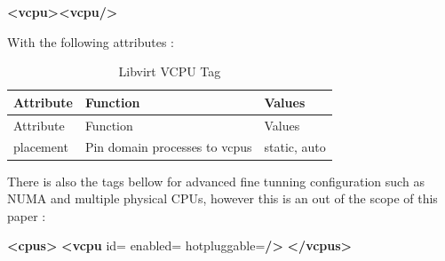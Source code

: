 \documentclass[
  14pt,
  english,
  a4paper,
]{scrreprt}
\newenvironment{Shaded}{}{}
\newcommand{\KeywordTok}[1]{\textcolor[rgb]{0.00,0.44,0.13}{\textbf{#1}}}
\newcommand{\OtherTok}[1]{\textcolor[rgb]{0.00,0.44,0.13}{#1}}
\newcommand{\StringTok}[1]{\textcolor[rgb]{0.25,0.44,0.63}{#1}}
\begin{document}
\begin{Shaded}
\begin{Highlighting}[]
\KeywordTok{\textless{}vcpu\textgreater{}\textless{}vcpu/\textgreater{}}
\end{Highlighting}
\end{Shaded}

With the following attributes :

\hypertarget{tbl:lvirt_vcpu_tag}{}
\begin{longtable}[]{@{}lll@{}}
\caption{\label{tbl:lvirt_vcpu_tag}Libvirt VCPU Tag}\tabularnewline
\toprule
\begin{minipage}[b]{0.15\columnwidth}\raggedright
Attribute\strut
\end{minipage} & \begin{minipage}[b]{0.41\columnwidth}\raggedright
Function\strut
\end{minipage} & \begin{minipage}[b]{0.19\columnwidth}\raggedright
Values\strut
\end{minipage}\tabularnewline
\midrule
\endfirsthead
\toprule
\begin{minipage}[b]{0.15\columnwidth}\raggedright
Attribute\strut
\end{minipage} & \begin{minipage}[b]{0.41\columnwidth}\raggedright
Function\strut
\end{minipage} & \begin{minipage}[b]{0.19\columnwidth}\raggedright
Values\strut
\end{minipage}\tabularnewline
\midrule
\endhead
\begin{minipage}[t]{0.15\columnwidth}\raggedright
placement\strut
\end{minipage} & \begin{minipage}[t]{0.41\columnwidth}\raggedright
Pin domain processes to vcpus\strut
\end{minipage} & \begin{minipage}[t]{0.19\columnwidth}\raggedright
static, auto\strut
\end{minipage}\tabularnewline
\bottomrule
\end{longtable}

There is also the tags bellow for advanced fine tunning configuration
such as NUMA and multiple physical CPUs, however this is an out of the
scope of this paper :

\begin{Shaded}
\begin{Highlighting}[]
\KeywordTok{\textless{}cpus\textgreater{}}
 \KeywordTok{\textless{}vcpu}\OtherTok{ id=}\StringTok{\textquotesingle{}\textquotesingle{}}\OtherTok{ enabled=}\StringTok{\textquotesingle{}\textquotesingle{}}\OtherTok{ hotpluggable=}\StringTok{\textquotesingle{}\textquotesingle{}}\KeywordTok{/\textgreater{}}
\KeywordTok{\textless{}/vcpus\textgreater{}}
\end{Highlighting}
\end{Shaded}
\end{document}
